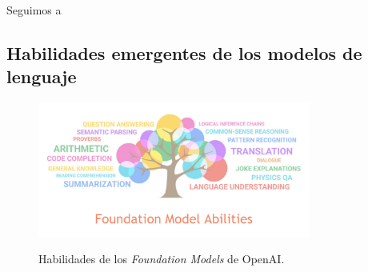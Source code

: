 Seguimos a \cite{arunbijiRAGVsFinetuning}


\subsection{Habilidades emergentes de los modelos de lenguaje}

\begin{figure}
    \caption{Habilidades de los \textit{Foundation Models} de OpenAI.}
    \centering
    \includegraphics[width=0.8\textwidth]{./figuras/fundation_models_habilities.png}
    \label{fig:fundation_models_habilities}
\end{figure}
